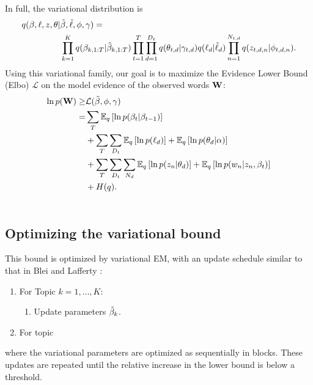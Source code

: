 In full, the variational distribution is
\begin{align}
  q(\beta, \ell, z, \theta | & \tilde{\beta}, \tilde{\ell}, \phi, \gamma) = \\ \nonumber
  & \prod_{k=1}^K q(\beta_{k,1:T} | \tilde{\beta}_{k,1:T})
  \prod_{t=1}^T \prod_{d=1}^{D_t} q(\theta_{t,d} | \gamma_{t,d})
  q(\ell_{d} | \tilde{\ell}_{d})
  \prod_{n=1}^{N_{t,d}} q(z_{t,d,n} | \phi_{t,d,n}). \nonumber
\end{align}
\vspace{-5pt}
Using this variational family, our goal is to maximize the Evidence Lower Bound (Elbo) $\mathcal{L}$ on the model evidence of the observed words $\textbf{W}$:
\begin{align}
  \ln p(\textbf{W}) \geq & \mathcal{L}(\tilde{\beta}, \phi, \gamma) \\ \nonumber
  = & \sum_T \mathbb{E}_q\left[\ln p(\beta_{t} | \beta_{t-1})\right] \\ \nonumber 
  & + \sum_{T} \sum_{D_t} \mathbb{E}_q\left[\ln p(\ell_{d})\right] + \mathbb{E}_q\left[\ln p(\theta_{d} | \alpha)\right] \\ \nonumber
  & + \sum_{T} \sum_{D_t} \sum_{N_d} \mathbb{E}_q\left[\ln p( z_n | \theta_d)\right] + \mathbb{E}_q\left[\ln p(w_n | z_n, \beta_t)\right] \\ \nonumber
  & + H(q). \\ \nonumber
  \label{eq:elbo}
\end{align}

\subsection*{Optimizing the variational bound}
This bound is optimized by variational EM, with an update schedule similar to that in Blei and Lafferty \cite{blei:2006}:
\begin{enumerate}
  \item For Topic $k=1, \ldots, K$:
    \begin{enumerate}
      \item Update parameters $\tilde{\beta}_k$.
    \end{enumerate}
  \item For topic 
\end{enumerate}
where the variational
parameters are optimized as sequentially in blocks.  These updates are
repeated until the relative increase in the lower bound is below a
threshold.

